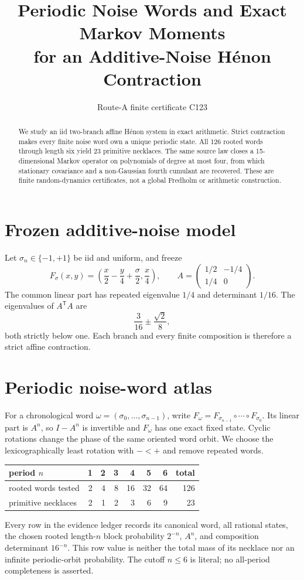 \documentclass[10pt]{article}
\title{Periodic Noise Words and Exact Markov Moments\\
for an Additive-Noise H\'enon Contraction}
\author{Route-A finite certificate C123}
\date{}
\begin{document}
\maketitle
\begin{abstract}
We study an iid two-branch affine H\'enon system in exact arithmetic.  Strict
contraction makes every finite noise word own a unique periodic state.  All
126 rooted words through length six yield 23 primitive necklaces.  The same
source law closes a 15-dimensional Markov operator on polynomials of degree at
most four, from which stationary covariance and a non-Gaussian fourth
cumulant are recovered.  These are finite random-dynamics certificates, not a
global Fredholm or arithmetic construction.
\end{abstract}

\section{Frozen additive-noise model}
Let $\sigma_n\in\{-1,+1\}$ be iid and uniform, and freeze
\[
 F_\sigma(x,y)=\left(\frac x2-\frac y4+\frac\sigma2,\frac x4\right),
 \qquad
 A=\begin{pmatrix}1/2&-1/4\\1/4&0\end{pmatrix}.
\]
The common linear part has repeated eigenvalue $1/4$ and determinant $1/16$.
The eigenvalues of $A^{\mathsf T}A$ are
\[
 \frac3{16}\pm\frac{\sqrt2}{8},
\]
both strictly below one.  Each branch and every finite composition is
therefore a strict affine contraction.

\section{Periodic noise-word atlas}
For a chronological word $\omega=(\sigma_0,\ldots,\sigma_{n-1})$, write
$F_\omega=F_{\sigma_{n-1}}\circ\cdots\circ F_{\sigma_0}$.
Its linear part is $A^n$, so $I-A^n$ is invertible and $F_\omega$ has one
exact fixed state.  Cyclic rotations change the phase of the same oriented
word orbit.  We choose the lexicographically least rotation with $-<+$ and
remove repeated words.

\begin{center}
\begin{tabular}{@{}lrrrrrrr@{}}
\toprule
period $n$ & 1&2&3&4&5&6&total\\
\midrule
rooted words tested &2&4&8&16&32&64&126\\
primitive necklaces &2&1&2&3&6&9&23\\
\bottomrule
\end{tabular}
\end{center}
Every row in the evidence ledger records its canonical word, all rational
states, the chosen rooted length-$n$ block probability $2^{-n}$, $A^n$, and
composition determinant $16^{-n}$.  This row value is neither the total mass
of its necklace nor an infinite periodic-orbit probability.  The cutoff
$n\le6$ is literal; no all-period completeness is asserted.
\end{document}
